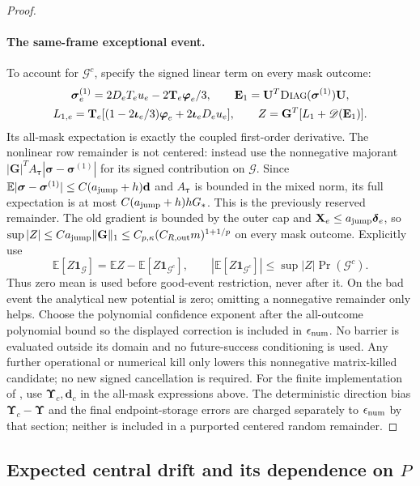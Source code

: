 \documentclass[11pt]{article}
\theoremstyle{remark}
\newcommand{\UU}{\mathbf U}
\newcommand{\ttau}{\boldsymbol{\tau}}
\newcommand{\ssigma}{\boldsymbol{\sigma}}
\newcommand{\UUps}{\boldsymbol{\Upsilon}}
\newcommand{\GG}{\mathbf G}
\newcommand{\TT}{\mathbf T}
\newcommand{\EE}{\mathbf E}
\newcommand{\XX}{\mathbf X}
\newcommand{\dd}{\mathbf d}
\newcommand{\pphi}{\boldsymbol{\varphi}}
\newcommand{\iiota}{\boldsymbol{\iota}}
\newcommand{\ddelta}{\boldsymbol{\delta}}
\newcommand{\diag}{\textsc{Diag}}
\newcommand{\Ex}{\mathbb E}
\newcommand{\norm}[1]{\lVert#1\rVert}
\begin{document}
\begin{proof}
\paragraph{The same-frame exceptional event.}
To account for $\mathcal G^c$, specify the signed linear term on every mask
outcome:
\[
\begin{gathered}
 \ssigma_e^{(1)}=2D_eT_eu_e-2\TT_e\pphi_e/3,\qquad
 \EE_1=\UU^T\diag(\ssigma^{(1)})\UU,\\
 L_{1,e}=\TT_e[(1-2\iiota_e/3)\pphi_e+2\iiota_eD_eu_e],
 \qquad Z=\GG^T[L_1+\mathscr D(\EE_1)].
\end{gathered}
\]
Its all-mask expectation is exactly the coupled first-order derivative.
The nonlinear row remainder is not centered: instead use the nonnegative
majorant $|\GG|^TA_{\ttau}|\ssigma-\ssigma^{(1)}|$ for its signed contribution on $\mathcal G$.
Since $\Ex|\ssigma-\ssigma^{(1)}|\le C(a_{\rm jump}+h)\dd$ and $A_{\ttau}$ is bounded in the
mixed norm, its full expectation is at most $C(a_{\rm jump}+h)hG_*$.
This is the previously reserved remainder.
The old gradient is bounded by the outer cap and $\XX_e\le a_{\rm jump}\ddelta_e$,
so $\sup|Z|\le Ca_{\rm jump}\norm{\GG}_1\le C_{p,\kappa} (C_{R,\rm out}m)^{1+1/p}$
on every mask outcome.
Explicitly use
\[
 \Ex[Z\mathbf1_{\mathcal G}]
 =\Ex Z-\Ex[Z\mathbf1_{\mathcal G^c}],
 \qquad
 |\Ex[Z\mathbf1_{\mathcal G^c}]|
 \le\sup|Z|\Pr(\mathcal G^c).
\]
Thus zero mean is used before good-event restriction, never after it.
On the bad event the analytical new potential is zero; omitting a nonnegative
remainder only helps.
Choose the polynomial confidence exponent after the all-outcome polynomial bound
so the displayed correction is included in $\epsilon_{\rm num}$.
No barrier is evaluated outside its domain and no future-success conditioning is
used.
Any further operational or numerical kill only lowers this nonnegative
matrix-killed candidate; no new signed cancellation is required.
For the finite implementation of , use $\UUps_c,\dd_c$
in the all-mask expressions above.
The deterministic direction bias $\UUps_c-\UUps$ and the final endpoint-storage errors
are charged separately to $\epsilon_{\rm num}$ by that section; neither is
included in a purported centered random remainder.
\end{proof}

\subsection{Expected central drift and its dependence on \texorpdfstring{$P$}{P}}
\end{document}
